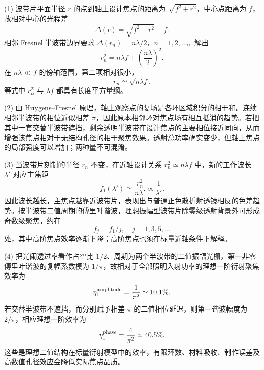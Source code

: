 (1) 波带片平面半径 \(r\) 的点到轴上设计焦点的距离为 \(\sqrt{f^2+r^2}\)，中心点距离为 \(f\)，故相对中心的光程差
\[
\Delta(r)=\sqrt{f^2+r^2}-f.
\]
相邻 Fresnel 半波带边界要求 \(\Delta(r_n)=n\lambda/2\)，\(n=1,2,\ldots\)。解出
\[
r_n^2=n\lambda f+\left(\frac{n\lambda}{2}\right)^2.
\]
在 \(n\lambda\ll f\) 的傍轴范围，第二项相对很小，
\[
r_n\simeq\sqrt{n\lambda f}.
\]
等式中 \(r_n^2\) 与 \(\lambda f\) 都具有长度平方量纲。

(2) 由 Huygens–Fresnel 原理，轴上观察点的复场是各环区域积分的相干和。连续相邻半波带的相位近似相差 \(\pi\)，因此原本相邻环对焦点场有相互抵消的趋势。若把其中一套交替半波带遮挡，剩余透明半波带在设计焦点的主要相位接近同向，从而增强该焦点相对于无结构孔径的相干聚焦效果。透射总功率确实变少，但轴上焦点的局部强度可以增加；两种量不可混淆。

(3) 当波带片刻制的半径 \(r_n\) 不变，在近轴设计关系 \(r_n^2\simeq n\lambda f\) 中，新的工作波长 \(\lambda'\) 对应主焦距
\[
f_1(\lambda')\simeq\frac{r_n^2}{n\lambda'}\propto\frac1{\lambda'}.
\]
因此波长越长，主焦点越靠近波带片，表现出与普通正色散折射透镜相反的色差趋势。按半波带二值周期的傅里叶谐波，理想振幅型波带片除零级透射背景外可形成奇数级聚焦，约在
\[
f_j=f_1/j,\quad j=1,3,5,\ldots
\]
处，其中高阶焦点效率逐渐下降；高阶焦点也须在标量近轴条件下解释。

(4) 把光阑透过率看作占空比 \(1/2\)、周期为两个半波带的二值振幅光栅，第一非零傅里叶谐波的复幅系数模为 \(1/\pi\)，故相对于全部照明入射功率的理想一阶衍射聚焦效率为
\[
\eta_1^{\rm amplitude}=\frac1{\pi^2}\simeq10.1\%.
\]
若交替半波带不遮挡，而分别赋予相差 \(\pi\) 的二值相位延迟，则第一谐波幅度为 \(2/\pi\)，相应理想一阶效率为
\[
\eta_1^{\rm phase}=\frac4{\pi^2}\simeq40.5\%.
\]
这些是理想二值结构在标量衍射模型中的效率，有限环数、材料吸收、制作误差及高数值孔径效应会降低实际焦点品质。
